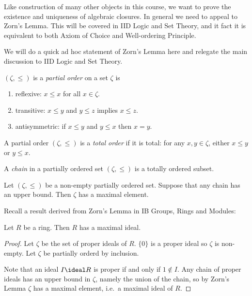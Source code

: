 \documentclass[a4paper]{article}
\begin{document}
Like construction of many other objects in this course, we want to prove the existence and uniqueness of algebraic closures. In general we need to appeal to Zorn's Lemma. This will be covered in IID Logic and Set Theory, and it fact it is equivalent to both Axiom of Choice and Well-ordering Principle.

We will do a quick ad hoc statement of Zorn's Lemma here and relegate the main discussion to IID Logic and Set Theory.

\begin{definition}
  \((\zeta, \leq)\) is a \emph{partial order} on a set \(\zeta\) is
  \begin{enumerate}
  \item reflexive: \(x \leq x\) for all \(x \in \zeta\).
  \item transitive: \(x \leq y\) and \(y \leq z\) implies \(x \leq z\).
  \item antisymmetric: if \(x \leq y\) and \(y \leq x\) then \(x = y\).
  \end{enumerate}
\end{definition}

\begin{definition}
  A partial order \((\zeta, \leq)\) is a \emph{total order} if it is total: for any \(x, y \in \zeta\), either \(x \leq y\) or \(y \leq x\).
\end{definition}

\begin{definition}[chain]
  A \emph{chain} in a partially ordered set \((\zeta, \leq)\) is a totally ordered subset.
\end{definition}

\begin{theorem}
  Let \((\zeta, \leq)\) be a non-empty partially ordered set. Suppose that any chain has an upper bound. Then \(\zeta\) has a maximal element.
\end{theorem}

Recall a result derived from Zorn's Lemma in IB Groups, Rings and Modules:

\begin{lemma}
  Let \(R\) be a ring. Then \(R\) has a maximal ideal.
\end{lemma}

\begin{proof}
  Let \(\zeta\) be the set of proper ideals of \(R\). \(\{0\}\) is a proper ideal so \(\zeta\) is non-empty. Let \(\zeta\) be partially orderd by inclusion.

  Note that an ideal \(I \ideal R\) is proper if and only if \(1 \notin I\). Any chain of proper ideals has an upper bound in \(\zeta\), namely the union of the chain, so by Zorn's Lemma \(\zeta\) has a maximal element, i.e.\ a maximal ideal of \(R\).
\end{proof}
\end{document}
